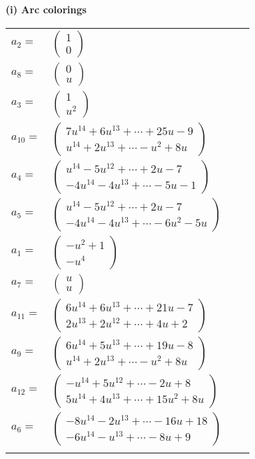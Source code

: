 \documentclass[1p]{elsarticle_modified}
\theoremstyle{definition}
\begin{document}
\flushleft \textbf{(i) Arc colorings}\\
\begin{tabular}{m{7pt} m{180pt} m{7pt} m{180pt} }
\flushright $a_{2}=$&$\begin{pmatrix}1\\0\end{pmatrix}$ \\
\flushright $a_{8}=$&$\begin{pmatrix}0\\u\end{pmatrix}$ \\
\flushright $a_{3}=$&$\begin{pmatrix}1\\u^2\end{pmatrix}$ \\
\flushright $a_{10}=$&$\begin{pmatrix}7 u^{14}+6 u^{13}+\cdots+25 u-9\\u^{14}+2 u^{13}+\cdots- u^2+8 u\end{pmatrix}$ \\
\flushright $a_{4}=$&$\begin{pmatrix}u^{14}-5 u^{12}+\cdots+2 u-7\\-4 u^{14}-4 u^{13}+\cdots-5 u-1\end{pmatrix}$ \\
\flushright $a_{5}=$&$\begin{pmatrix}u^{14}-5 u^{12}+\cdots+2 u-7\\-4 u^{14}-4 u^{13}+\cdots-6 u^2-5 u\end{pmatrix}$ \\
\flushright $a_{1}=$&$\begin{pmatrix}- u^2+1\\- u^4\end{pmatrix}$ \\
\flushright $a_{7}=$&$\begin{pmatrix}u\\u\end{pmatrix}$ \\
\flushright $a_{11}=$&$\begin{pmatrix}6 u^{14}+6 u^{13}+\cdots+21 u-7\\2 u^{13}+2 u^{12}+\cdots+4 u+2\end{pmatrix}$ \\
\flushright $a_{9}=$&$\begin{pmatrix}6 u^{14}+5 u^{13}+\cdots+19 u-8\\u^{14}+2 u^{13}+\cdots- u^2+8 u\end{pmatrix}$ \\
\flushright $a_{12}=$&$\begin{pmatrix}- u^{14}+5 u^{12}+\cdots-2 u+8\\5 u^{14}+4 u^{13}+\cdots+15 u^2+8 u\end{pmatrix}$ \\
\flushright $a_{6}=$&$\begin{pmatrix}-8 u^{14}-2 u^{13}+\cdots-16 u+18\\-6 u^{14}- u^{13}+\cdots-8 u+9\end{pmatrix}$\\&\end{tabular}
\end{document}

